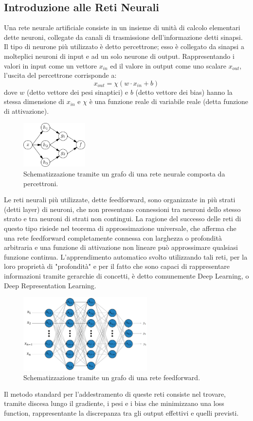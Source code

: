 \documentclass[a4paper]{article}
\begin{document}
\subsection{Introduzione alle Reti Neurali}
Una rete neurale artificiale consiste in un insieme di unità di calcolo elementari dette neuroni, collegate da canali di trasmissione dell'informazione detti sinapsi.
Il tipo di neurone più utilizzato è detto percettrone; esso è collegato da sinapsi a molteplici neuroni di input e ad un solo neurone di output. Rappresentando i valori in input come un vettore $x_{in}$ ed il valore in output come uno scalare $x_{out}$, l'uscita del percettrone corrisponde a:
\begin{equation}
x_{out} = \chi (w \cdot x_{in} + b)
\end{equation}
dove $w$ (detto vettore dei pesi sinaptici) e $b$ (detto vettore dei bias) hanno la stessa dimensione di $x_{in}$ e $\chi$ è una funzione reale di variabile reale (detta funzione di attivazione).
\begin{figure}[H]
\includegraphics[width=0.3\textwidth]{grafo.pdf}
\centering
\caption{Schematizzazione tramite un grafo di una rete neurale composta da percettroni.}
\end{figure}
Le reti neurali più utilizzate, dette feedforward, sono organizzate in più strati (detti layer) di neuroni, che non presentano connessioni tra neuroni dello stesso strato e tra neuroni di strati non contingui.
La ragione del successo delle reti di questo tipo risiede nel teorema di approssimazione universale, che afferma che una rete feedforward completamente connessa con larghezza o profondità arbitraria e una funzione di attivazione non lineare può approssimare qualsiasi funzione continua. L'apprendimento automatico svolto utilizzando tali reti, per la loro proprietà di "profondità" e per il fatto che sono capaci di rappresentare informazioni tramite gerarchie di concetti, è detto comunemente Deep Learning, o Deep Representation Learning.
\begin{figure}[H]
\includegraphics[width=0.6\textwidth]{information-10-00122-g002.png}
\centering
\caption{Schematizzazione tramite un grafo di una rete feedforward.}
\end{figure}
Il metodo standard per l'addestramento di queste reti consiste nel trovare, tramite discesa lungo il gradiente, i pesi e i bias che minimizzano una loss function, rappresentante la discrepanza tra gli output effettivi e quelli previsti.
\end{document}
